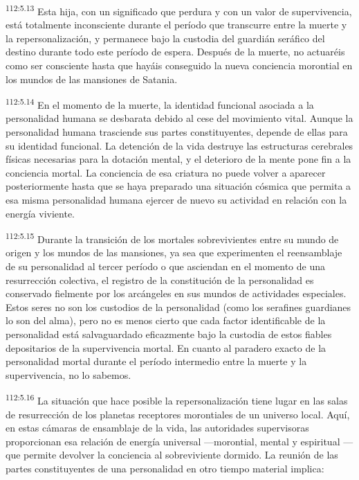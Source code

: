 \par
\textsuperscript{112:5.13} Esta hija, con un significado que perdura y con un valor de supervivencia, está totalmente inconsciente durante el período que transcurre entre la muerte y la repersonalización, y permanece bajo la custodia del guardián seráfico del destino durante todo este período de espera. Después de la muerte, no actuaréis como ser consciente hasta que hayáis conseguido la nueva conciencia morontial en los mundos de las mansiones de Satania.

\par
\textsuperscript{112:5.14} En el momento de la muerte, la identidad funcional asociada a la personalidad humana se desbarata debido al cese del movimiento vital. Aunque la personalidad humana trasciende sus partes constituyentes, depende de ellas para su identidad funcional. La detención de la vida destruye las estructuras cerebrales físicas necesarias para la dotación mental, y el deterioro de la mente pone fin a la conciencia mortal. La conciencia de esa criatura no puede volver a aparecer posteriormente hasta que se haya preparado una situación cósmica que permita a esa misma personalidad humana ejercer de nuevo su actividad en relación con la energía viviente.

\par
\textsuperscript{112:5.15} Durante la transición de los mortales sobrevivientes entre su mundo de origen y los mundos de las mansiones, ya sea que experimenten el reensamblaje de su personalidad al tercer período o que asciendan en el momento de una resurrección colectiva, el registro de la constitución de la personalidad es conservado fielmente por los arcángeles en sus mundos de actividades especiales. Estos seres no son los custodios de la personalidad (como los serafines guardianes lo son del alma), pero no es menos cierto que cada factor identificable de la personalidad está salvaguardado eficazmente bajo la custodia de estos fiables depositarios de la supervivencia mortal. En cuanto al paradero exacto de la personalidad mortal durante el período intermedio entre la muerte y la supervivencia, no lo sabemos.

\par
\textsuperscript{112:5.16} La situación que hace posible la repersonalización tiene lugar en las salas de resurrección de los planetas receptores morontiales de un universo local. Aquí, en estas cámaras de ensamblaje de la vida, las autoridades supervisoras proporcionan esa relación de energía universal ---morontial, mental y espiritual --- que permite devolver la conciencia al sobreviviente dormido. La reunión de las partes constituyentes de una personalidad en otro tiempo material implica:

